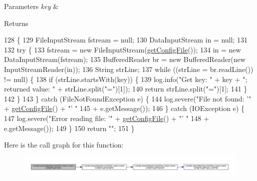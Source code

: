 \begin{DoxyParams}{Parameters}
{\em key} & \\
\hline
\end{DoxyParams}
\begin{DoxyReturn}{Returns}

\end{DoxyReturn}

\begin{DoxyCode}
128                                               \{
129         FileInputStream fstream = null;
130         DataInputStream in = null;
131 
132         \textcolor{keywordflow}{try} \{
133             fstream = \textcolor{keyword}{new} FileInputStream(\hyperlink{classit_1_1isislab_1_1masonhelperdocumentation_1_1mason_1_1control_1_1_config_file_ac533dd01e862be359ae060d278daf1ea}{getConfigFile}());
134             in = \textcolor{keyword}{new} DataInputStream(fstream);
135             BufferedReader br = \textcolor{keyword}{new} BufferedReader(\textcolor{keyword}{new} InputStreamReader(in));
136             String strLine;
137             \textcolor{keywordflow}{while} ((strLine = br.readLine()) != null) \{
138                 \textcolor{keywordflow}{if} (strLine.startsWith(key)) \{
139                     log.info(\textcolor{stringliteral}{"Get key: "} + key + \textcolor{stringliteral}{"; returned value: "} + strLine.split(\textcolor{stringliteral}{"="})[1]);
140                     \textcolor{keywordflow}{return} strLine.split(\textcolor{stringliteral}{"="})[1];
141                 \}
142             \}
143         \} \textcolor{keywordflow}{catch} (FileNotFoundException e) \{
144             log.severe(\textcolor{stringliteral}{"File not found: '"} + \hyperlink{classit_1_1isislab_1_1masonhelperdocumentation_1_1mason_1_1control_1_1_config_file_ac533dd01e862be359ae060d278daf1ea}{getConfigFile}() + \textcolor{stringliteral}{"' "}
145                     + e.getMessage());
146         \} \textcolor{keywordflow}{catch} (IOException e) \{
147             log.severe(\textcolor{stringliteral}{"Error reading file: '"} + \hyperlink{classit_1_1isislab_1_1masonhelperdocumentation_1_1mason_1_1control_1_1_config_file_ac533dd01e862be359ae060d278daf1ea}{getConfigFile}() + \textcolor{stringliteral}{"' "}
148                     + e.getMessage());
149         \}
150         \textcolor{keywordflow}{return} \textcolor{stringliteral}{""};
151     \}
\end{DoxyCode}


Here is the call graph for this function\-:
\nopagebreak
\begin{figure}[H]
\begin{center}
\leavevmode
\includegraphics[width=350pt]{classit_1_1isislab_1_1masonhelperdocumentation_1_1mason_1_1control_1_1_config_file_a7bcf08b34e48f0c5116d796d616113f0_cgraph}
\end{center}
\end{figure}




